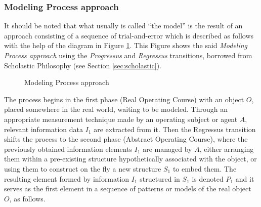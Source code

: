 \documentclass[11pt, a4paper]{article}
\begin{document}
\subsubsection*{Modeling Process approach}

It should be noted that what usually is called ``the model'' is the result of an approach consisting of a sequence of trial-and-error which is described as follows with the help of the diagram in Figure \ref{fig:modeling1}. This Figure  shows the said \emph{Modeling Process approach} using the \textit{Progressus} and \textit{Regressus} transitions, borrowed from Scholastic Philosophy (see Section \ref{sec:scholastic}).

\begin{figure}[h]
\begin{center}
\end{center}\vspace{-3ex}
\caption{Modeling Process approach}
\label{fig:modeling1}
\end{figure}


The process begins in the first phase (Real Operating Course) with an object $O$, placed somewhere in the real world, waiting to be modeled. Through an appropriate measurement technique made by an operating subject or agent $A$, relevant information data $I_1$ are extracted from it. Then the Regressus transition shifts the process to the second phase (Abstract Operating Course), where the previously obtained information elements $I_1$ are managed by $A$, either arranging them within a pre-existing structure hypothetically associated with the object, or using them to construct on the fly a new structure $S_1$ to embed them. The resulting element formed by information $I_1$ structured in $S_1$ is denoted $P_1$ and it serves as the first element in a sequence of patterns or models of the real object $O$, as follows.
\end{document}
